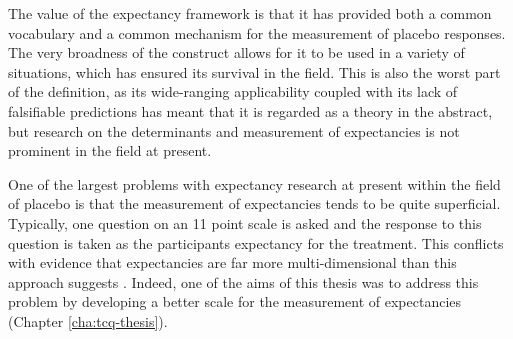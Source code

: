 

The value of the expectancy framework is that it has provided both a common vocabulary and a common mechanism for the measurement of placebo responses. The very broadness of the construct allows for it to be used in a variety of situations, which has ensured its survival in the field. This is also the worst part of the definition, as its wide-ranging applicability coupled with its lack of falsifiable predictions has meant that it is regarded as a theory in the abstract, but research on the determinants and measurement of expectancies is not prominent in the field at present.

One of the largest problems with expectancy research at present within the field of placebo is that the measurement of expectancies tends to be quite superficial. Typically, one question on an 11 point scale is asked and the response to this question is taken as the participants expectancy for the treatment. This conflicts with evidence that expectancies are far more multi-dimensional than this approach suggests \cite{Stone2005}. Indeed, one of the aims of this thesis was to address this problem by developing a better scale for the measurement of expectancies (Chapter \ref{cha:tcq-thesis}). 

